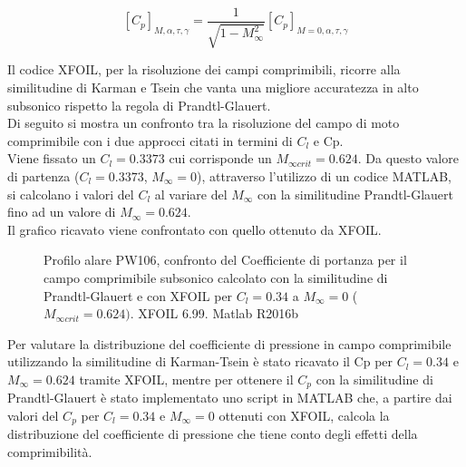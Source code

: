 \begin{equation}
\label{eqn:prandtl}
[C_p]_{M,{\alpha},{\tau},{\gamma}}=\frac {1}{\sqrt{1-M^2_{\infty}}}[C_p]_{M=0,{\alpha},{\tau},{\gamma}}
\end{equation}


Il codice XFOIL, per la risoluzione dei campi comprimibili, ricorre alla similitudine di Karman e Tsein che vanta una migliore accuratezza in alto subsonico rispetto la regola di Prandtl-Glauert. \\
Di seguito si mostra un confronto tra la risoluzione del campo di moto comprimibile con i due approcci citati in termini di $C_l$ e Cp. \\


Viene fissato un $C_l=0.3373$ cui corrisponde un $ M_{\infty crit}=0.624$. Da questo valore di partenza ($C_l=0.3373$, $M_{\infty}=0$), attraverso l'utilizzo di un codice MATLAB, si calcolano i valori del $C_l$ al variare del $ M_{\infty}$ con la similitudine Prandtl-Glauert fino ad un valore di $M_{\infty}=0.624$.\\ Il grafico ricavato viene confrontato con quello ottenuto da XFOIL.

\begin{figure} [H]
\centering
{}
\caption{\footnotesize Profilo alare PW106, confronto del Coefficiente di portanza per il campo comprimibile subsonico calcolato con la similitudine di Prandtl-Glauert e con XFOIL per $C_l=0.34$ a $ M_{\infty}=0$ ($ M_{\infty crit}=0.624)$. XFOIL 6.99. Matlab R2016b}\label{fig:cp}
\end{figure}

Per valutare la distribuzione del coefficiente di pressione in campo comprimibile utilizzando la similitudine di  Karman-Tsein è stato ricavato il Cp per $C_l=0.34$ e $M_{\infty}=0.624$ tramite XFOIL, mentre per ottenere il  $C_p$ con la similitudine di Prandtl-Glauert è stato implementato uno script in MATLAB che, a partire dai valori del $C_p$ per $C_l=0.34$ e $M_{\infty}=0$ ottenuti con XFOIL, calcola la distribuzione del coefficiente di pressione che tiene conto degli effetti della comprimibilità.


